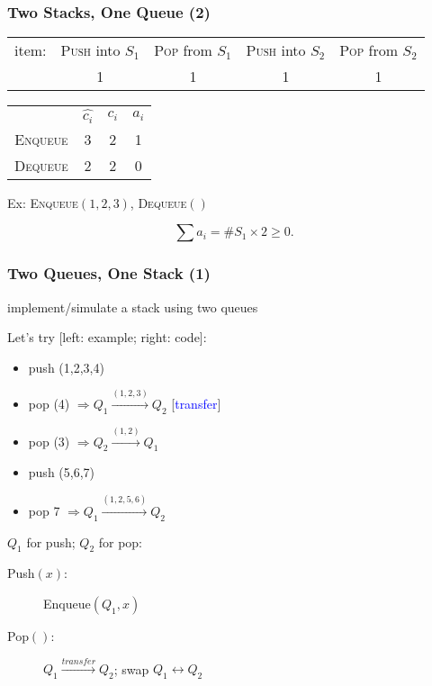 \documentclass{beamer}
\begin{document}
\begin{frame}
  \frametitle{Two Stacks, One Queue (2)}
  
  \begin{table}
    \begin{tabular}{ccccc}
	  item: & \textsc{Push} into $S_1$ & \textsc{Pop} from $S_1$ & \textsc{Push}
	  into $S_2$ & \textsc{Pop} from $S_2$ \\
	  & 1 & 1 & 1 & 1
    \end{tabular}
  \end{table}

  \begin{table}
    \begin{tabular}{cccc}
	  & $\hat{c_i}$ & $c_i$ & $a_i$ \\
	  \textsc{Enqueue} & 3 & 2 & 1 \\
	  \textsc{Dequeue} & 2 & 2 & 0
    \end{tabular}
  \end{table} 
  Ex: \textsc{Enqueue}$(1,2,3)$, \textsc{Dequeue}$()$
  
  \[ \sum a_i = \#S_1 \times 2 \geq 0.\] 
\end{frame}

\begin{frame}
  \frametitle{Two Queues, One Stack (1)}
  
  \begin{Problem}
    implement/simulate a stack using two queues
  \end{Problem}
  
  Let's try [left: example; right: code]:
  \begin{itemize}
    \item push (1,2,3,4)
    \item pop (4) $\Rightarrow Q_1 \xrightarrow{(1,2,3)} Q_2$
    [\textcolor{blue}{transfer}]
    \item pop (3) $\Rightarrow Q_2 \xrightarrow{(1,2)} Q_1$
    \item push (5,6,7)
    \item pop 7 $\Rightarrow Q_1 \xrightarrow{(1,2,5,6)} Q_2$
  \end{itemize}
  
  \vspace{0.50cm}
  $Q_1$ for push; $Q_2$ for pop:
  \begin{description}
    \item[Push$(x)$:] Enqueue$(Q_1,x)$
    \item[Pop$()$:] $Q_1 \xrightarrow{transfer} Q_2$; swap $Q_1 \leftrightarrow
    Q_2$
  \end{description}
\end{frame}
\end{document}
